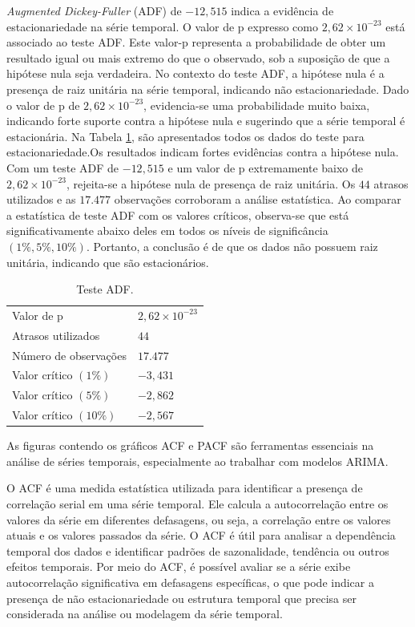 \textit{Augmented Dickey-Fuller} (ADF) de $-12,515$ indica a evidência de estacionariedade na série temporal. 
O valor de p expresso como $2,62\times 10^{-23}$ está associado ao teste ADF. Este valor-p representa a probabilidade de obter um resultado igual ou mais extremo do que o observado, sob a suposição de que a hipótese nula seja verdadeira. No contexto do teste ADF, a hipótese nula é a presença de raiz unitária na série temporal, indicando não estacionariedade. Dado o valor de p de $2,62\times 10^{-23}$, evidencia-se uma probabilidade muito baixa, indicando forte suporte contra a hipótese nula e sugerindo que a série temporal é estacionária. Na Tabela \ref{tb:adf}, são apresentados todos os dados do teste para estacionariedade.Os resultados indicam fortes evidências contra a hipótese nula. Com um teste ADF de $-12,515 $ e um valor de p extremamente baixo de $2,62 \times 10^{-23}$, rejeita-se a hipótese nula de presença de raiz unitária. Os $44$ atrasos utilizados e as $17.477$ observações corroboram a análise estatística. Ao comparar a estatística de teste ADF com os valores críticos, observa-se que está significativamente abaixo deles em todos os níveis de significância $(1\%, 5\%, 10\%)$. Portanto, a conclusão é de que os dados não possuem raiz unitária, indicando que são estacionários.

\begin{table}[!htb]
	\centering
	\caption{Teste ADF.}\label{tb:adf}
	\begin{tabular}{ll}
		\hline
		Valor de p & $2,62 \times 10^{-23}$ \\
		Atrasos utilizados & $44$ \\
		Número de observações & $17.477$ \\
		Valor crítico $(1\%)$ & $-3,431$ \\
		Valor crítico $(5\%)$ & $-2,862$ \\
		Valor crítico $(10\%)$ & $-2,567$ \\
		\hline
	\end{tabular}
\end{table}


As figuras contendo os gráficos ACF e PACF são ferramentas essenciais na análise de séries temporais, especialmente ao trabalhar com modelos ARIMA. 

O ACF é uma medida estatística utilizada para identificar a presença de correlação serial em uma série temporal. Ele calcula a autocorrelação entre os valores da série em diferentes defasagens, ou seja, a correlação entre os valores atuais e os valores passados da série. O ACF é útil para analisar a dependência temporal dos dados e identificar padrões de sazonalidade, tendência ou outros efeitos temporais. Por meio do ACF, é possível avaliar se a série exibe autocorrelação significativa em defasagens específicas, o que pode indicar a presença de não estacionariedade ou estrutura temporal que precisa ser considerada na análise ou modelagem da série temporal.

